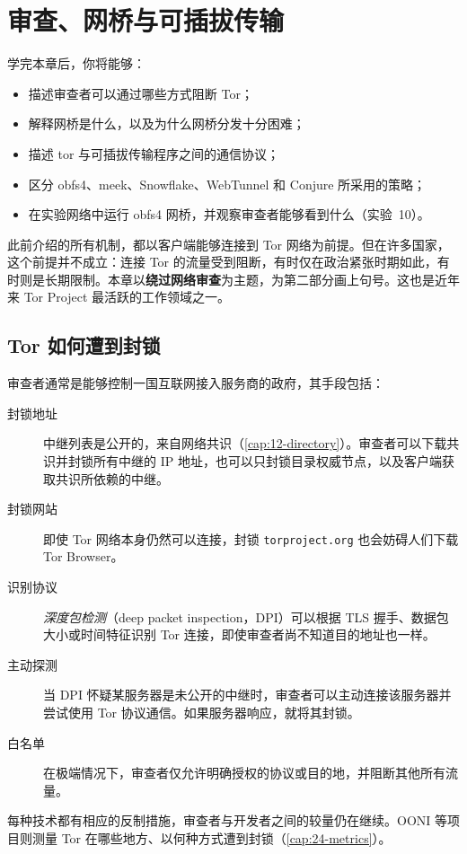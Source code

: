 \chapter{审查、网桥与可插拔传输}\label{cap:16-censura}

\begin{obiettivi}
学完本章后，你将能够：
\begin{itemize}[nosep]
  \item 描述审查者可以通过哪些方式阻断 Tor；
  \item 解释网桥是什么，以及为什么网桥分发十分困难；
  \item 描述 tor 与可插拔传输程序之间的通信协议；
  \item 区分 obfs4、meek、Snowflake、WebTunnel 和 Conjure 所采用的策略；
  \item 在实验网络中运行 obfs4 网桥，并观察审查者能够看到什么（实验~10）。
\end{itemize}
\end{obiettivi}

此前介绍的所有机制，都以客户端能够连接到 Tor 网络为前提。但在许多国家，这个前提并不成立：连接 Tor 的流量受到阻断，有时仅在政治紧张时期如此，有时则是长期限制。本章以\textbf{绕过网络审查}为主题，为第二部分画上句号。这也是近年来 Tor Project 最活跃的工作领域之一。

\section{Tor 如何遭到封锁}\label{sec:cens-blocco}

审查者通常是能够控制一国互联网接入服务商的政府，其手段包括：
\begin{description}
  \item[封锁地址] 中继列表是公开的，来自网络共识（\cref{cap:12-directory}）。审查者可以下载共识并封锁所有中继的 IP 地址，也可以只封锁目录权威节点，以及客户端获取共识所依赖的中继。
  \item[封锁网站] 即使 Tor 网络本身仍然可以连接，封锁 \texttt{torproject.org} 也会妨碍人们下载 Tor Browser。
  \item[识别协议] \emph{深度包检测}（deep packet inspection，DPI）可以根据 TLS 握手、数据包大小或时间特征识别 Tor 连接，即使审查者尚不知道目的地址也一样。
  \item[主动探测] 当 DPI 怀疑某服务器是未公开的中继时，审查者可以主动连接该服务器并尝试使用 Tor 协议通信。如果服务器响应，就将其封锁。
  \item[白名单] 在极端情况下，审查者仅允许明确授权的协议或目的地，并阻断其他所有流量。
\end{description}
每种技术都有相应的反制措施，审查者与开发者之间的较量仍在继续。OONI 等项目则测量 Tor 在哪些地方、以何种方式遭到封锁（\cref{cap:24-metrics}）。

